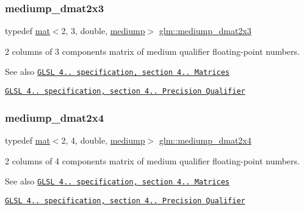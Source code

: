 \subsubsection{\texorpdfstring{mediump\+\_\+dmat2x3}{mediump\_dmat2x3}}
{\footnotesize\ttfamily typedef \mbox{\hyperlink{structglm_1_1mat}{mat}}$<$2, 3, double, \mbox{\hyperlink{namespaceglm_a36ed105b07c7746804d7fdc7cc90ff25a6416f3ea0c9025fb21ed50c4d6620482}{mediump}}$>$ \mbox{\hyperlink{group__core__precision_gaf3a6e61247ffcbbf9211186d0d250a2b}{glm\+::mediump\+\_\+dmat2x3}}}

2 columns of 3 components matrix of medium qualifier floating-\/point numbers.

\begin{DoxySeeAlso}{See also}
\href{http://www.opengl.org/registry/doc/GLSLangSpec.4.20.8.pdf}{\tt G\+L\+SL 4.. specification, section 4.. Matrices} 

\href{http://www.opengl.org/registry/doc/GLSLangSpec.4.20.8.pdf}{\tt G\+L\+SL 4.. specification, section 4.. Precision Qualifier} 
\end{DoxySeeAlso}
\mbox{\label{group__core__precision_ga20d1a647a3ef0083e306d026c77ac906}} 
\subsubsection{\texorpdfstring{mediump\+\_\+dmat2x4}{mediump\_dmat2x4}}
{\footnotesize\ttfamily typedef \mbox{\hyperlink{structglm_1_1mat}{mat}}$<$2, 4, double, \mbox{\hyperlink{namespaceglm_a36ed105b07c7746804d7fdc7cc90ff25a6416f3ea0c9025fb21ed50c4d6620482}{mediump}}$>$ \mbox{\hyperlink{group__core__precision_ga20d1a647a3ef0083e306d026c77ac906}{glm\+::mediump\+\_\+dmat2x4}}}

2 columns of 4 components matrix of medium qualifier floating-\/point numbers.

\begin{DoxySeeAlso}{See also}
\href{http://www.opengl.org/registry/doc/GLSLangSpec.4.20.8.pdf}{\tt G\+L\+SL 4.. specification, section 4.. Matrices} 

\href{http://www.opengl.org/registry/doc/GLSLangSpec.4.20.8.pdf}{\tt G\+L\+SL 4.. specification, section 4.. Precision Qualifier} 
\end{DoxySeeAlso}
\mbox{\label{group__core__precision_gaf1be0a781d33d2450a31e64e09d8d18f}} 
